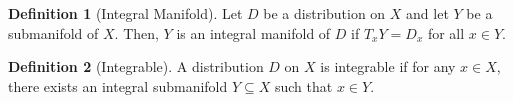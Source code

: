 \documentclass[]{article}
\theoremstyle{definition}
\theoremstyle{definition}
\newtheorem{definition}{Definition}[section]
\begin{document}
\begin{definition}[Integral Manifold]
  Let \(D\) be a distribution on \(X\) and let \(Y\) be a submanifold of \(X\). Then,
  \(Y\) is an integral manifold of \(D\) if \(T_x Y = D_x\) for all \(x \in Y\).
\end{definition}

\begin{definition}[Integrable]
  A distribution \(D\) on \(X\) is integrable if for any \(x \in X\), there exists 
  an integral submanifold \(Y \subseteq X\) such that \(x \in Y\).
\end{definition}
\end{document}
